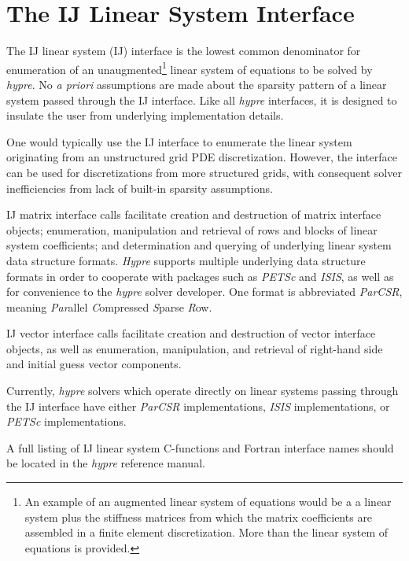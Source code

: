 \chapter{The IJ Linear System Interface}
\label{IJ}

The IJ linear system (IJ) interface is the lowest common
denominator for enumeration of an 
unaugmented\footnote{An example of an augmented
linear system of equations would be a 
a linear system plus the stiffness matrices from which the matrix
coefficients are assembled in a finite element discretization.
More than the linear system of equations is provided.}
linear system of equations to be solved by {\slshape hypre}.
No {\itshape a priori} assumptions are made about the sparsity
pattern of a linear system passed through the IJ interface.
Like all {\slshape hypre} interfaces, it is designed
to insulate the user from underlying implementation details.

One would typically use the IJ interface to enumerate the linear
system originating from an unstructured grid PDE discretization.
However, the interface can be used for discretizations from more
structured grids, with consequent solver inefficiencies from lack
of built-in sparsity assumptions.

IJ matrix interface calls facilitate creation and destruction of 
matrix interface objects; enumeration, manipulation and retrieval
of rows and blocks of linear system coefficients; and determination
and querying of underlying linear system data structure formats.
{\slshape Hypre} supports multiple underlying data structure formats
in order to cooperate
with packages such as {\slshape PETSc} and {\slshape ISIS},
as well as for convenience to the {\slshape hypre} solver developer.
One format is abbreviated {\itshape ParCSR}, meaning {\itshape Par}allel
{\itshape C}ompressed {\itshape S}parse {\itshape R}ow.

IJ vector interface calls facilitate creation and destruction of
vector interface objects, as well as enumeration, manipulation,
and retrieval of right-hand side and initial guess vector components.

Currently, {\slshape hypre} solvers which operate directly on linear
systems passing through the IJ interface have either
{\itshape ParCSR} implementations, {\slshape ISIS} implementations,
or {\slshape PETSc} implementations.

A full listing of IJ linear system C-functions and Fortran
interface names should be located in the {\slshape hypre} reference
manual.

